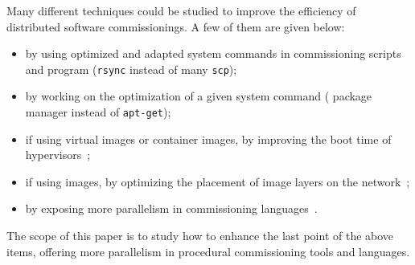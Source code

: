 Many different techniques could be studied to improve the efficiency
of distributed software commissionings. A few of them are given below:
\begin{itemize}
\item by using optimized and adapted system commands in commissioning
  scripts and program (\eg \texttt{rsync} instead of many
  \texttt{scp});
\item by working on the optimization of a given system command (\eg
  \nix package manager instead of \texttt{apt-get});
\item if using virtual images or container images, by improving the
  boot time of hypervisors~\cite{yolo};
\item if using \docker images, by optimizing the placement of image
  layers on the network~\cite{Nitro};
\item by exposing more parallelism in commissioning
  languages~\cite{madeus, aeolus}.
\end{itemize}

\begin{tcolorbox}[enhanced,attach boxed title to top left={yshift=-3mm,yshifttext=-1mm},
  colback=black!5!white,colframe=black!30,colbacktitle=black!60,
  title=Scope,fonttitle=\bfseries,
  boxed title style={size=small,colframe=black!60,boxrule=0.2mm},
  boxrule=0.2mm]
  The scope of this paper is to study how to enhance the last point of
  the above items, \ie offering more parallelism in procedural
  commissioning tools and languages.
\end{tcolorbox}
